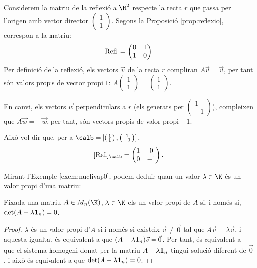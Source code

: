 \begin{exemple}
Considerem la matriu de la reflexió a $\R^2$ respecte la recta $r$ que passa per l'origen amb vector director $\left(\begin{smallmatrix}1\\1\end{smallmatrix}\right)$. Segons la Proposició \ref{prop:reflexio}, correspon a la matriu:
$$
\operatorname{Refl}{}=\begin{pmatrix}
0 & 1 \\ 1 & 0
\end{pmatrix}
$$
Per definició de la reflexió, els vectors $\vec v$ de la recta $r$ compliran $A\vec v=\vec v$, per tant són valors propis de vector propi $1$: $A\left(\begin{smallmatrix}1\\1\end{smallmatrix}\right)=\left(\begin{smallmatrix}1\\1\end{smallmatrix}\right)$.

En canvi, els vectors $\vec w$ perpendiculars a $r$ (els generats per $\left(\begin{smallmatrix}1\\-1\end{smallmatrix}\right)$), compleixen que $A\vec w=-\vec w$, per tant, són vectors propis de valor propi $-1$.

Això vol dir que, per a $\calb=[\left(\begin{smallmatrix}1\\1\end{smallmatrix}\right),\left(\begin{smallmatrix}1\\-1\end{smallmatrix}\right)]$, 
$$
[\refl]_\calb=\begin{pmatrix}
1 & 0 \\ 0 & -1
\end{pmatrix}.
$$
\end{exemple}
Mirant l'Exemple \ref{exem:nuclivap0}, podem deduir quan un valor $\lambda\in\K$ és un valor propi d'una matriu:
\begin{teorema}\label{teo:vapsA}
Fixada una matriu $A\in M_n(\K)$, $\lambda\in\K$ els un valor propi de $A$ si, i només si, $\det(A-\lambda\mathbf{1}_n)=0$.
\end{teorema}
\begin{proof}
$\lambda$ és un valor propi d'$A$ si i només si existeix $\vec v\neq \vec 0$ tal que $A\vec v=\lambda \vec v$, i aquesta igualtat és equivalent a que $(A-\lambda \mathbf{1}_n)\vec v=\vec 0$. Per tant, és equivalent a que el sistema homogeni donat per la matriu $A-\lambda\mathbf{1}_n$ tingui solució diferent de $\vec 0$, i això és equivalent a que $\det(A-\lambda\mathbf{1}_n)=0$.
\end{proof}

